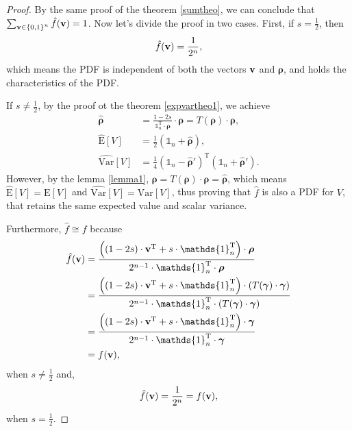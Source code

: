 \documentclass{article}
\newcommand{\0}{\mathbbold{0}}
\newcommand{\1}{\mathds{1}}
\newcommand{\2}{\mathbbold{2}}
\newcommand{\T}{^{\operatorname{T}}}
\begin{document}
\begin{proof}
    By the same proof of the theorem \ref{sumtheo}, we can conclude that $\sum_{{\bf v} \in \left\{0,1\right\}^n} \hat{f}({\bf v}) = 1$.
    Now let's divide the proof in two cases. First, if $s = \frac{1}{2}$, then
    $$ \hat{f}({\bf v}) = \frac{1}{2^n}, $$
    which means the PDF is independent of both the vectors ${\bf v}$ and ${\boldsymbol \rho}$, and holds the characteristics of the PDF.

    If $s \ne \frac{1}{2}$, by the proof ot the theorem \ref{expvartheo1}, we achieve
    \begin{align*}
        \hat{\boldsymbol \rho} &= \frac{1-2s}{\1_n\T\cdot {\boldsymbol \rho}}\cdot {\boldsymbol \rho} = T({\boldsymbol \rho}) \cdot {\boldsymbol \rho}, \\
        \widehat{\text{E}}[V] &= \frac{1}{2}\left(\1_n + \hat{\boldsymbol \rho}\right) , \\
        \widehat{\text{Var}}[V] &= \frac{1}{4}\left(\1_n - \hat{\boldsymbol \rho}'\right)\T\left(\1_n + \hat{\boldsymbol \rho}'\right).
    \end{align*}
    However, by the lemma \ref{lemma1}, ${\boldsymbol \rho} = T({\boldsymbol \rho}) \cdot {\boldsymbol \rho} = \hat{\boldsymbol \rho}$, which means $\widehat{\text{E}}[V] = \text{E}[V]$ and $\widehat{\text{Var}}[V] = \text{Var}[V]$, thus proving that $\hat{f}$ is also a PDF for $V$, that retains the same expected value and scalar variance.

    Furthermore, $\hat{f} \cong f$ because
    \begin{align*}
        \hat{f}({\bf v}) &= \frac{\left(\left(1-2s\right) \cdot {\bf v}\T + s\cdot\1_n\T\right) \cdot {\boldsymbol \rho}}{2^{n-1}\cdot \1_n\T \cdot {\boldsymbol \rho}} \\
        &= \frac{\left(\left(1-2s\right) \cdot {\bf v}\T + s\cdot\1_n\T\right) \cdot \left(T({\boldsymbol \gamma})\cdot {\boldsymbol \gamma}\right) }{2^{n-1}\cdot \1_n\T \cdot \left(T({\boldsymbol \gamma})\cdot {\boldsymbol \gamma}\right)} \\
        &= \frac{\left(\left(1-2s\right) \cdot {\bf v}\T + s\cdot\1_n\T\right) \cdot {\boldsymbol \gamma}}{2^{n-1}\cdot \1_n\T \cdot {\boldsymbol \gamma}} \\
        &= f({\bf v}),
    \end{align*}
    when $s \ne \frac{1}{2}$ and,
    $$ \hat{f}({\bf v}) = \frac{1}{2^n} = f({\bf v}), $$
    when $s = \frac{1}{2}$.
\end{proof}
\end{document}
